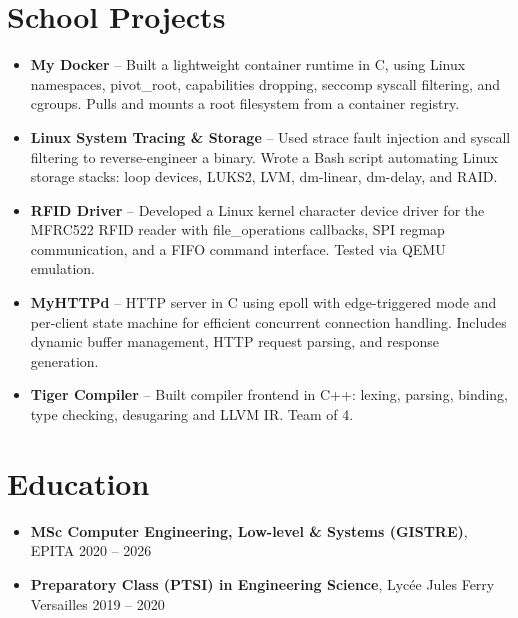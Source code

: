 \documentclass[9pt,a4paper]{article}
\begin{document}
\section*{School Projects}
\begin{tcolorbox}[mybox]
\begin{itemize}
\item \textbf{My Docker} -- Built a lightweight container runtime in C, using Linux namespaces, pivot\_root, capabilities dropping, seccomp syscall filtering, and cgroups. Pulls and mounts a root filesystem from a container registry.

\item \textbf{Linux System Tracing \& Storage} -- Used strace fault injection and syscall filtering to reverse-engineer a binary. Wrote a Bash script automating Linux storage stacks: loop devices, LUKS2, LVM, dm-linear, dm-delay, and RAID.

\item \textbf{RFID Driver} -- Developed a Linux kernel character device driver for the MFRC522 RFID reader with file\_operations callbacks, SPI regmap communication, and a FIFO command interface. Tested via QEMU emulation.

\item \textbf{MyHTTPd} -- HTTP server in C using epoll with edge-triggered mode and per-client state machine for efficient concurrent connection handling. Includes dynamic buffer management, HTTP request parsing, and response generation.

\item \textbf{Tiger Compiler} -- Built compiler frontend in C++: lexing, parsing, binding, type checking, desugaring and LLVM IR. Team of 4.
\end{itemize}
\end{tcolorbox}


\section*{Education}
\begin{tcolorbox}[mybox]
\begin{itemize}
\item \textbf{MSc Computer Engineering, Low-level \& Systems (GISTRE)}, EPITA {\small{\hfill 2020 – 2026}}

\item \textbf{Preparatory Class (PTSI) in Engineering Science}, Lycée Jules Ferry Versailles {\small{\hfill 2019 – 2020}}
\end{itemize}
\end{tcolorbox}
\end{document}
